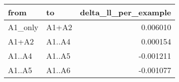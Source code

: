 \begin{tabular}{llr}
\toprule
from & to & delta\_ll\_per\_example \\
\midrule
A1\_only & A1+A2 & 0.006010 \\
A1+A2 & A1..A4 & 0.000154 \\
A1..A4 & A1..A5 & -0.001211 \\
A1..A5 & A1..A6 & -0.001077 \\
\bottomrule
\end{tabular}
